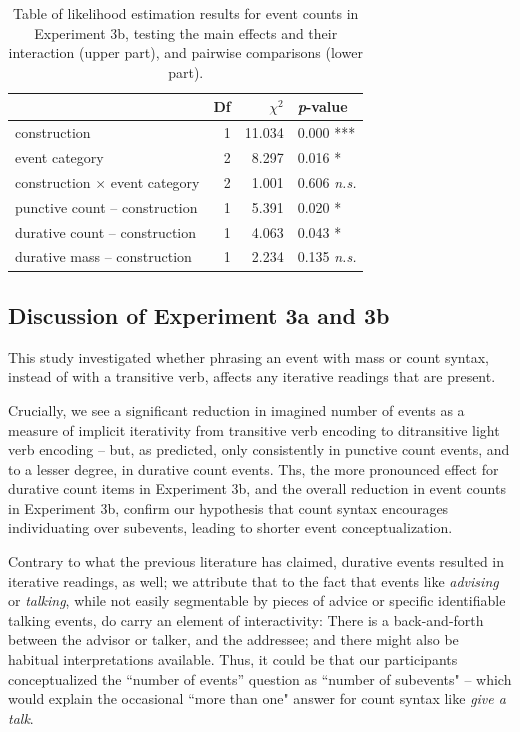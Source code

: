 \documentclass[preprint,12pt,authoryear]{elsarticle}
\begin{document}
\begin{table}[ht]
\centering
\begin{tabular}{lrrl}
  \hline
 & Df &  $\chi^2$ & \emph{p}-value \\ 
  \hline
construction          & 1 &  11.034 & 0.000 *** \\ 
  event category          & 2 &  8.297 & 0.016 *\\ 
  construction $\times$ event category & 2 & 1.001 & 0.606 \emph{n.s.} \\    \hline
   punctive count -- construction    & 1 & 5.391 & 0.020 * \\    
   durative count -- construction    & 1  & 4.063 & 0.043 *\\ 
   durative mass -- construction   & 1 &  2.234 & 0.135 \emph{n.s.}\\ \hline
\end{tabular}
\caption{Table of likelihood estimation results for event counts in Experiment 3b, testing the main effects and their interaction (upper part), and pairwise comparisons (lower part).}
\label{tab_countsregr3b}
\end{table}

\subsection{Discussion of Experiment 3a and 3b}\label{sec_discHowMany}

This study investigated whether phrasing an event with mass or count syntax, instead of with a transitive verb, affects any iterative readings that are present. 

Crucially, we see a significant reduction in imagined number of events as a measure of implicit iterativity from transitive verb encoding to ditransitive light verb encoding -- but, as predicted, only consistently in punctive count events, and to a lesser degree, in durative count events. Ths, the more pronounced effect for durative count items in Experiment 3b, and the overall reduction in event counts in Experiment 3b, confirm our hypothesis that count syntax encourages individuating over subevents, leading to shorter event conceptualization. 

Contrary to what the previous literature has claimed, durative events resulted in iterative readings, as well; we attribute that to the fact that events like \emph{advising} or \emph{talking}, while not easily segmentable by pieces of advice or specific identifiable talking events, do carry an element of interactivity: There is a back-and-forth between the advisor or talker, and the addressee; and there might also be habitual interpretations available. Thus, it could be that our participants conceptualized the ``number of events'' question as ``number of subevents" -- which would explain the occasional ``more than one" answer for count syntax like \emph{give a talk}. 
\end{document}
